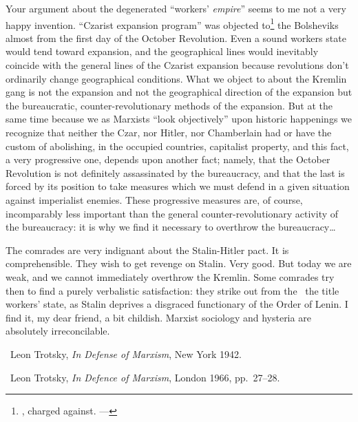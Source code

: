 Your argument about the degenerated “workers’ \emph{empire}” seems to me not a very happy invention. “Czarist expansion program” was objected to\footnote{\ie, charged against. ---\ed} the Bolsheviks almost from the first day of the October Revolution. Even a sound workers state would tend toward expansion, and the geographical lines would inevitably coincide with the general lines of the Czarist expansion because revolutions don’t ordinarily change geographical conditions. What we object to about the Kremlin gang is not the expansion and not the geographical direction of the expansion but the bureaucratic, counter-revolutionary methods of the expansion. But at the same time because we as Marxists “look objectively” upon historic happenings we recognize that neither the Czar, nor Hitler, nor Chamberlain had or have the custom of abolishing, in the occupied countries, capitalist property, and this fact, a very progressive one, depends upon another fact; namely, that the October Revolution is not definitely assassinated by the bureaucracy, and that the last is forced by its position to take measures which we must defend in a given situation against imperialist enemies. These progressive measures are, of course, incomparably less important than the general counter-revolutionary activity of the bureaucracy: it is why we find it necessary to overthrow the bureaucracy\dots

The comrades are very indignant about the Stalin-Hitler pact. It is comprehensible. They wish to get revenge on Stalin. Very good. But today we are weak, and we cannot immediately overthrow the Kremlin. Some comrades try then to find a purely verbalistic satisfaction: they strike out from the \USSR\ the title workers’ state, as Stalin deprives a disgraced functionary of the Order of Lenin. I find it, my dear friend, a bit childish. Marxist sociology and hysteria are absolutely irreconcilable.


\newpage

\begin{letterinfo}
	\firstpublished\ Leon Trotsky, \emph{In Defense of Marxism}, New York 1942.
	
	\checkedagainst\ Leon Trotsky, \emph{In Defence of Marxism}, London 1966, pp.~27--28.
	
    \footnoteslatter
\end{letterinfo}
